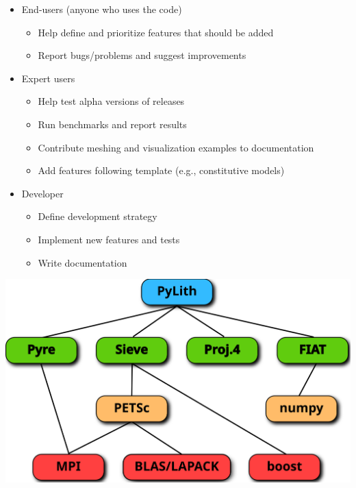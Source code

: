 \documentclass[pdftex,cig,slideColor]{pp4slides}
\begin{document}
  \begin{itemize}
  \item End-users (anyone who uses the code)
    \begin{itemize}
    \item Help define and prioritize features that should be added
    \item Report bugs/problems and suggest improvements
    \end{itemize}
  \item Expert users
    \begin{itemize}
    \item Help test alpha versions of releases
    \item Run benchmarks and report results
    \item Contribute meshing and visualization examples to documentation
    \item Add features following template (e.g., constitutive models)
    \end{itemize}
  \item Developer
    \begin{itemize}
    \item Define development strategy 
    \item Implement new features and tests
    \item Write documentation
    \end{itemize}
  \end{itemize}


  \vfill
  \begin{center}
    \includegraphics[scale=0.9]{figs/packages}
  \end{center}
\end{document}

